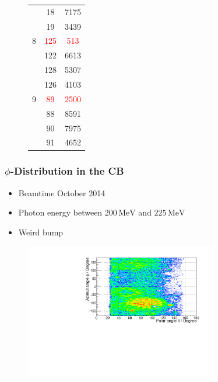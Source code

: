 \documentclass[slidestop,compress,mathserif]{beamer}
\begin{document}
\begin{frame}
\begin{figure}
\begin{minipage}[t]{.4\textwidth}
{\begin{tabular}{lcc}
				& 18& 7175 \\
				
				& 19& 3439 \\
				
				\hline
				
				8 & \textcolor{red}{125} &\textcolor{red}{513} \\
				
				
				& 122& 6613\\
				
				& 128 & 5307 \\
				
				& 126 & 4103 \\
				
				\hline
				
				9 & \textcolor{red}{89}& \textcolor{red}{2500}\\
				
				& 88& 8591\\
				
				&90&7975 \\
				
				&91&4652 \\
				
				
				
			\end{tabular}
		}	
		\end{minipage}
	\end{figure}
\end{frame}

\begin{frame}
	\frametitle{$\phi$-Distribution in the CB}
	\begin{itemize}
		\item Beamtime October 2014
		\item Photon energy between $200\,\text{MeV}$ and $225\,\text{MeV}$
		\item Weird bump
	\end{itemize}
	\begin{figure}
		\includegraphics[width=0.75\textwidth]{Pictures/20172404ThetaPhi200MeVBeam}
		
	\end{figure}
\end{frame}
\end{document}
